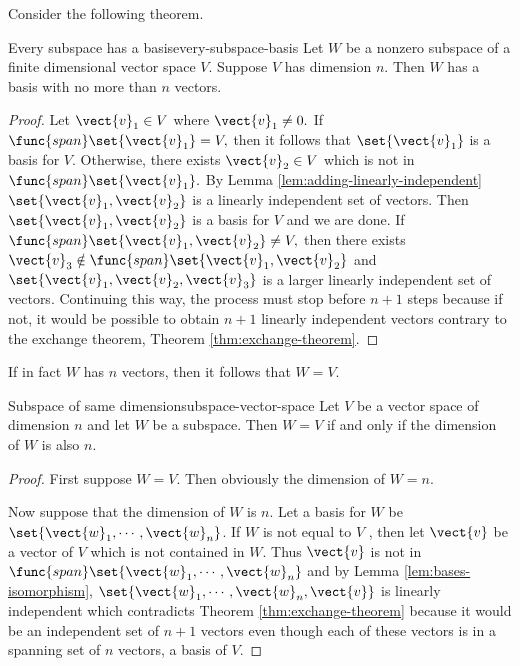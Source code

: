 Consider the following theorem. 

\begin{theorem}{Every subspace has a basis}{every-subspace-basis}
Let $W$ be a nonzero subspace of a finite dimensional vector
space $V$. Suppose $V$ has dimension $n$.
Then $W$ has a basis
with no more than $n$ vectors.
\end{theorem}

\begin{proof}
Let $\vect{v}_{1}\in V$ where $\vect{v}_{1}\neq 0.$ If $
\func{span}\set{\vect{v}_{1}} =V,$ then it follows that $\set{\vect{v}
_{1}} $ is a basis for $V$. Otherwise, there exists $\vect{v}
_{2}\in V$ which is not in $\func{span}\set{\vect{v}_{1}} .$ By
Lemma \ref{lem:adding-linearly-independent} $\set{\vect{v}_{1},\vect{v}_{2}} $ is a
linearly independent set of vectors. Then $\set{\vect{v}_{1},\vect{v}
_{2}} $ is a basis for $V$ and we are done. If $\func{span}\set{\vect{v}_{1},
\vect{v}_{2}} \neq V,$ then there exists $\vect{v}_{3}\notin \func{
span}\set{\vect{v}_{1},\vect{v}_{2}} $ and $\set{\vect{v}
_{1},\vect{v}_{2},\vect{v}_{3}} $ is a larger linearly
independent set of vectors. Continuing this way, the process must stop
before $n+1$ steps because if not, it would be possible to obtain $n+1$
linearly independent vectors contrary to the exchange theorem, Theorem \ref{thm:exchange-theorem}. 
\end{proof}

If in fact $W$ has $n$ vectors, then it follows that $W=V$. 

\begin{theorem}{Subspace of same dimension}{subspace-vector-space}
Let $V$ be a vector space of dimension $n$ and let $W$ be a
subspace. Then $W=V$ if and only if the dimension of $W$ is also $n$.
\end{theorem}

\begin{proof}First suppose $W=V.$ Then obviously the dimension of $W=n.$

Now suppose that the dimension of $W$ is $n$. Let a basis for $W$ be $
\set{\vect{w}_{1},\cdots ,\vect{w}_{n}} $. If $W$ is not equal to $V$
, then let $\vect{v}$ be a vector of $V$ which is not contained in $W.$ Thus $
\vect{v}$ is not in $\func{span}\set{\vect{w}_{1},\cdots ,\vect{w}
_{n}} $ and by Lemma \ref{lem:bases-isomorphism}, $\set{\vect{w}_{1},\cdots ,\vect{w}_{n},\vect{v}} $ is linearly independent which contradicts
Theorem \ref{thm:exchange-theorem} because it would be an independent set of $n+1$
vectors even though each of these vectors is in a spanning set of $n$
vectors, a basis of $V$. 
\end{proof}


